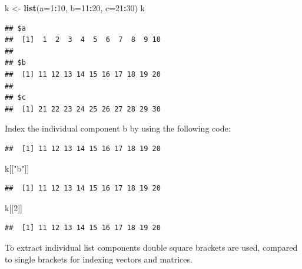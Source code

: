 \documentclass[]{book}
\newenvironment{Shaded}{\begin{snugshade}}{\end{snugshade}}
\newcommand{\KeywordTok}[1]{\textcolor[rgb]{0.13,0.29,0.53}{\textbf{#1}}}
\newcommand{\DataTypeTok}[1]{\textcolor[rgb]{0.13,0.29,0.53}{#1}}
\newcommand{\DecValTok}[1]{\textcolor[rgb]{0.00,0.00,0.81}{#1}}
\newcommand{\StringTok}[1]{\textcolor[rgb]{0.31,0.60,0.02}{#1}}
\newcommand{\OperatorTok}[1]{\textcolor[rgb]{0.81,0.36,0.00}{\textbf{#1}}}
\newcommand{\NormalTok}[1]{#1}
\begin{document}
\begin{Shaded}
\begin{Highlighting}[]
\NormalTok{k <-}\StringTok{ }\KeywordTok{list}\NormalTok{(}\DataTypeTok{a=}\DecValTok{1}\OperatorTok{:}\DecValTok{10}\NormalTok{, }\DataTypeTok{b=}\DecValTok{11}\OperatorTok{:}\DecValTok{20}\NormalTok{, }\DataTypeTok{c=}\DecValTok{21}\OperatorTok{:}\DecValTok{30}\NormalTok{)}
\NormalTok{k}
\end{Highlighting}
\end{Shaded}

\begin{verbatim}
## $a
##  [1]  1  2  3  4  5  6  7  8  9 10
## 
## $b
##  [1] 11 12 13 14 15 16 17 18 19 20
## 
## $c
##  [1] 21 22 23 24 25 26 27 28 29 30
\end{verbatim}

Index the individual component b by using the following code:

\begin{Shaded}
\end{Shaded}

\begin{verbatim}
##  [1] 11 12 13 14 15 16 17 18 19 20
\end{verbatim}

\begin{Shaded}
\begin{Highlighting}[]
\NormalTok{k[[}\StringTok{"b"}\NormalTok{]]}
\end{Highlighting}
\end{Shaded}

\begin{verbatim}
##  [1] 11 12 13 14 15 16 17 18 19 20
\end{verbatim}

\begin{Shaded}
\begin{Highlighting}[]
\NormalTok{k[[}\DecValTok{2}\NormalTok{]]}
\end{Highlighting}
\end{Shaded}

\begin{verbatim}
##  [1] 11 12 13 14 15 16 17 18 19 20
\end{verbatim}

To extract individual list components double square brackets are used,
compared to single brackets for indexing vectors and matrices.
\end{document}
